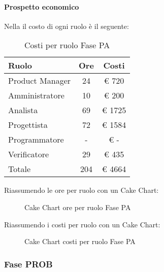 			\paragraph{Prospetto economico}
				Nella  il costo di ogni ruolo è il seguente:
				\begin{table}
					\begin{center}
						\begin{tabular}{| l | c | c |}
							\hline
							Ruolo 				& Ore 		& Costi  \\ \hline
							
							Product Manager		& 24 		& \euro{} 720 	\\
							Amministratore 		& 10 		& \euro{} 200 	\\
							Analista	 		& 69 		& \euro{} 1725 	\\
							Progettista 		& 72 		& \euro{} 1584  	\\
							Programmatore		& - 		& \euro{} - 	\\
							Verificatore		& 29 		& \euro{} 435 	\\ \hline \hline
							
							Totale	 			& 204 		& \euro{} 4664 	\\ \hline
						\end{tabular}
					\end{center}
					\caption{Costi per ruolo Fase PA}
				\end{table}
				Riassumendo le ore per ruolo con un Cake Chart:
				\begin{figure}\centering
					\caption{Cake Chart ore per ruolo Fase PA}
				\end{figure}
				Riassumendo i costi per ruolo con un Cake Chart:
				\begin{figure}\centering
					\caption{Cake Chart costi per ruolo Fase PA}
				\end{figure}
		\subsubsection{Fase PROB}
